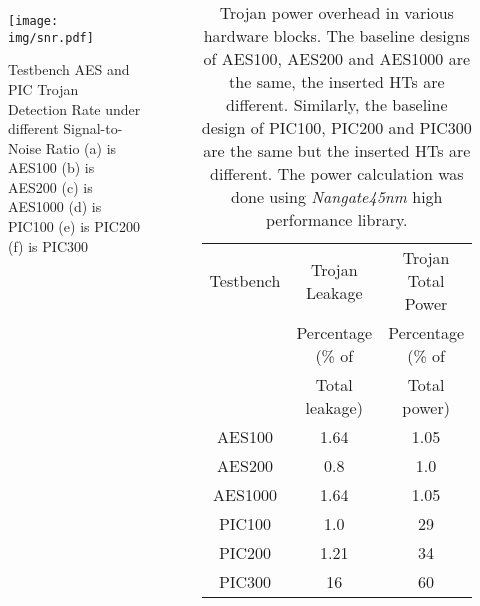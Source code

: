 \documentclass{beamer}
\begin{document}
\begin{columns}
                \begin{figure}[ht]
                    \centering
                    \texttt{[image: img/snr.pdf]}
                    \vspace{-0.25in}
                    \label{fig:snr}
                    \caption{
                        {\color{black}Testbench AES and PIC Trojan Detection Rate under different
                    Signal-to-Noise Ratio
                    (a) is AES100
                    (b) is AES200
                    (c) is AES1000
                    (d) is PIC100
                    (e) is PIC200
                    (f) is PIC300}
                    }
                    \vspace{-0.15in}
                \end{figure}

                \begin{table}[!t]
                    \begin{center}
                    \begin{tabular*}{\columnwidth}{c c c}
                        Testbench & Trojan Leakage        & Trojan Total Power  \\
                                  & Percentage (\% of     & Percentage (\% of \\
                                  & Total leakage)        & Total power) \\
                    \hline
                        AES100    & 1.64           & 1.05 \\
                        AES200    & 0.8            & 1.0 \\
                        AES1000   & 1.64           & 1.05 \\
                        PIC100    &1.0             & 29 \\
                        PIC200    & 1.21           & 34\\
                        PIC300    &16              & 60 \\
                    \end{tabular*}
                    \vspace{-0.1in}%
                    \caption{Trojan power overhead in various hardware blocks. The
                    baseline designs of AES100, AES200 and AES1000 are the same, the inserted HTs
                    are different. Similarly, the baseline design of PIC100, PIC200 and PIC300
                    are the same but the inserted HTs are different. {\color{black}The power calculation was done using \textit{Nangate45nm} high performance library.}}
                    \vspace{-0.35in}
                    \label{tab:power}
                    \end{center}
                \end{table}


\end{columns}
\end{document}
